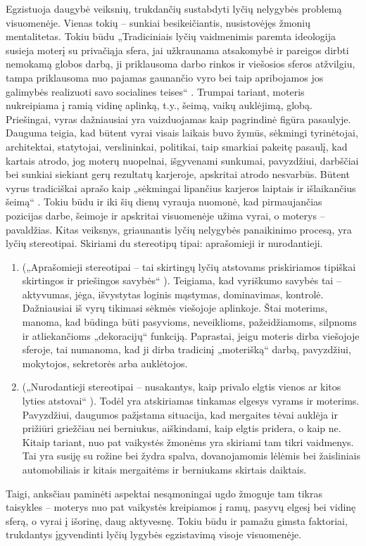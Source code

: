 \documentclass[titlepage, 11pt]{article}
\begin{document}
Egzistuoja daugybė veiksnių, trukdančių sustabdyti lyčių nelygybės problemą visuomenėje. Vienas tokių – sunkiai besikeičiantis, nusistovėjęs žmonių mentalitetas. Tokiu būdu „Tradiciniais lyčių vaidmenimis paremta ideologija susieja moterį su privačiąja sfera, jai užkraunama atsakomybė ir pareigos dirbti nemokamą globos darbą, ji priklausoma darbo rinkos ir viešosios sferos atžvilgiu, tampa priklausoma nuo pajamas gaunančio vyro bei taip apribojamos jos galimybės realizuoti savo socialines teises“ \cite{maslauskiene2004globa}. Trumpai tariant, moteris nukreipiama į ramią vidinę aplinką, t.y., šeimą, vaikų auklėjimą, globą. Priešingai, vyras dažniausiai yra vaizduojamas kaip pagrindinė figūra pasaulyje. Dauguma teigia, kad būtent vyrai visais laikais buvo žymūs, sėkmingi tyrinėtojai, architektai, statytojai, verslininkai, politikai, taip smarkiai pakeitę pasaulį, kad kartais atrodo, jog moterų nuopelnai, išgyvenami sunkumai, pavyzdžiui, darbščiai bei sunkiai siekiant gerų rezultatų karjeroje, apskritai atrodo nesvarbūs. Būtent vyrus tradiciškai aprašo kaip „sėkmingai lipančius karjeros laiptais ir išlaikančius šeimą“ \cite{maslauskiene2004globa}. Tokiu būdu ir iki šių dienų vyrauja nuomonė, kad pirmaujančias pozicijas darbe, šeimoje ir apskritai visuomenėje užima vyrai, o moterys – pavaldžias. Kitas veiksnys, griaunantis lyčių nelygybės panaikinimo procesą, yra lyčių stereotipai. Skiriami du stereotipų tipai: aprašomieji ir nurodantieji.
\begin{enumerate}

\item  („Aprašomieji stereotipai – tai skirtingų lyčių atstovams priskiriamos tipiškai skirtingos ir priešingos savybės“ \cite{Reinikovaite1998zmogus} ). Teigiama, kad vyriškumo savybės tai – aktyvumas, jėga, išvystytas loginis mąstymas, dominavimas, kontrolė. Dažniausiai iš vyrų tikimasi sėkmės viešojoje aplinkoje. Štai moterims, manoma, kad būdinga būti pasyvioms, neveiklioms, pažeidžiamoms, silpnoms ir atliekančioms „dekoracijų“ funkciją. Paprastai,  jeigu moteris dirba viešojoje sferoje, tai numanoma, kad ji dirba tradicinį „moterišką“ darbą, pavyzdžiui, mokytojos, sekretorės arba auklėtojos. 
\item („Nurodantieji stereotipai – nusakantys, kaip privalo elgtis vienos ar kitos lyties atstovai“ \cite{Reinikovaite1998zmogus}). Todėl yra atskiriamas tinkamas elgesys vyrams ir moterims. Pavyzdžiui, daugumos pažįstama situacija, kad mergaites tėvai auklėja ir prižiūri griežčiau nei berniukus, aiškindami, kaip elgtis pridera, o kaip ne. Kitaip tariant, nuo pat vaikystės žmonėms yra skiriami tam tikri vaidmenys. Tai yra susiję su rožine bei žydra spalva, dovanojamomis lėlėmis bei žaisliniais automobiliais ir kitais mergaitėms ir berniukams skirtais daiktais.
\end{enumerate}
Taigi, anksčiau paminėti aspektai nesąmoningai ugdo žmoguje tam tikras taisykles – moterys nuo pat vaikystės kreipiamos į ramų, pasyvų elgesį bei vidinę sferą, o vyrai į išorinę, daug aktyvesnę. Tokiu būdu ir pamažu gimsta faktoriai, trukdantys įgyvendinti lyčių lygybės egzistavimą visoje visuomenėje.
\end{document}
